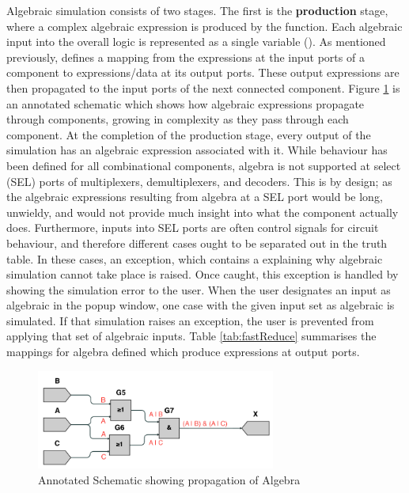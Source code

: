 Algebraic simulation consists of two stages. The first is the \textbf{production} stage, where a complex algebraic expression is produced by the  function. Each algebraic input into the overall logic is represented as a single variable (). As mentioned previously,  defines a mapping from the expressions at the input ports of a component to expressions/data at its output ports. These output expressions are then propagated to the input ports of the next connected component. Figure \ref{fig:annotatealgebra} is an annotated schematic which shows how algebraic expressions propagate through components, growing in complexity as they pass through each component. At the completion of the production stage, every output of the simulation has an algebraic expression associated with it. While behaviour has been defined for all combinational components, algebra is not supported at select (SEL) ports of multiplexers, demultiplexers, and decoders. This is by design; as the algebraic expressions resulting from algebra at a SEL port would be long, unwieldy, and would not provide much insight into what the component actually does. Furthermore, inputs into SEL ports are often control signals for circuit behaviour, and therefore different cases ought to be separated out in the truth table. In these cases, an  exception, which contains a  explaining why algebraic simulation cannot take place is raised. Once caught, this exception is handled by showing the simulation error to the user. When the user designates an input as algebraic in the popup window, one case with the given input set as algebraic is simulated. If that simulation raises an exception, the user is prevented from applying that set of algebraic inputs. Table \ref{tab:fastReduce} summarises the mappings for algebra defined  which produce expressions at output ports.

\begin{figure}[h]
    \centering
    \includegraphics[width=0.7\textwidth]{05.ImpPlan/annotations.png}
    \caption{Annotated Schematic showing propagation of Algebra}
    \label{fig:annotatealgebra}
\end{figure}

